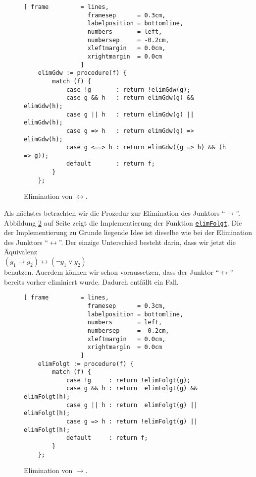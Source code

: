 \begin{figure}[!ht]
  \centering
\begin{Verbatim}[ frame         = lines, 
                  framesep      = 0.3cm, 
                  labelposition = bottomline,
                  numbers       = left,
                  numbersep     = -0.2cm,
                  xleftmargin   = 0.0cm,
                  xrightmargin  = 0.0cm
                ]
    elimGdw := procedure(f) {
        match (f) {
            case !g       : return !elimGdw(g);
            case g && h   : return elimGdw(g) && elimGdw(h);
            case g || h   : return elimGdw(g) || elimGdw(h);
            case g => h   : return elimGdw(g) => elimGdw(h);
            case g <==> h : return elimGdw((g => h) && (h => g));
            default       : return f; 
        }
    };
\end{Verbatim}
\vspace*{-0.3cm}
  \caption{Elimination von $\leftrightarrow$.}
  \label{fig:eliminate-gdw}
\end{figure} 

Als n\"{a}chstes betrachten wir die Prozedur zur Elimination des Junktors ``$\rightarrow$''. 
Abbildung
\ref{fig:eliminate-folgt} auf Seite \pageref{fig:eliminate-folgt} zeigt die
Implementierung der Funktion
\href{https://github.com/karlstroetmann/Logik/blob/master/SetlX/knf.stlx}{\texttt{elimFolgt}}.
Die der Implementierung zu Grunde liegende Idee ist dieselbe wie bei der Elimination des
Junktors ``$\leftrightarrow$''.  Der einzige Unterschied besteht darin, dass wir jetzt die
\"{A}quivalenz \\[0.2cm]
\hspace*{1.3cm} $(g_1 \rightarrow g_2) \leftrightarrow (\neg g_1 \vee g_2)$ \\[0.2cm]
benutzen.  Au\3erdem k\"{o}nnen wir schon voraussetzen, dass der Junktor ``$\leftrightarrow$''
bereits vorher eliminiert wurde.  Dadurch entf\"{a}llt ein Fall.

\begin{figure}[!ht]
  \centering
\begin{Verbatim}[ frame         = lines, 
                  framesep      = 0.3cm, 
                  labelposition = bottomline,
                  numbers       = left,
                  numbersep     = -0.2cm,
                  xleftmargin   = 0.0cm,
                  xrightmargin  = 0.0cm
                ]
    elimFolgt := procedure(f) {
        match (f) {
            case !g     : return !elimFolgt(g);
            case g && h : return  elimFolgt(g) && elimFolgt(h);
            case g || h : return  elimFolgt(g) || elimFolgt(h);
            case g => h : return !elimFolgt(g) || elimFolgt(h);
            default     : return f; 
        }
    };
\end{Verbatim}
\vspace*{-0.3cm}
  \caption{Elimination von $\rightarrow$.}
  \label{fig:eliminate-folgt}
\end{figure}
 
